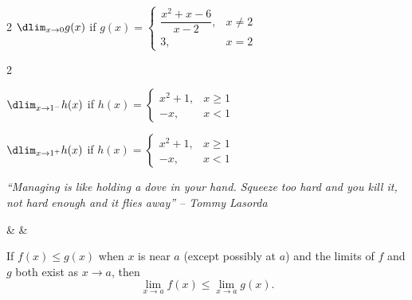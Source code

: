\documentclass{book}
\begin{document}
\begin{enumerate}[!HW!]
\begin{multicols}{2}
\itemspade $\dlim_{x\to 0} g(x)$ if $g(x) = \begin{cases} \dfrac{x^2+x-6}{x-2}, & x \neq 2\\  3, & x=2\end{cases}$ 
\end{multicols}
\begin{multicols}{2}
\item $\dlim_{x\to 1^-} h(x)$ if $h(x) = \begin{cases} x^2+1, & x \ge 1 \\ -x, & x < 1 \end{cases}$ 
\item $\dlim_{x\to 1^+} h(x)$ if $h(x) = \begin{cases} x^2+1, & x \ge 1 \\ -x, & x < 1 \end{cases}$ 
\end{multicols}
\end{enumerate}
\pagebreak
\begin{center} 
\emph{``Managing is like holding a dove in your hand. Squeeze too hard and you kill it, not hard enough and it flies away'' -- Tommy Lasorda}
\end{center}

\begin{Videos}
 &
  &
\end{Videos}

\begin{Thm} If $f(x) \le g(x)$ when $x$ is near $a$ (except possibly at $a$) and the limits of $f$ and $g$ both exist as $x \to a$, then \[\lim_{x\to a} f(x) \le \lim_{x\to a} g(x).\]\end{Thm}\vs
\end{document}

